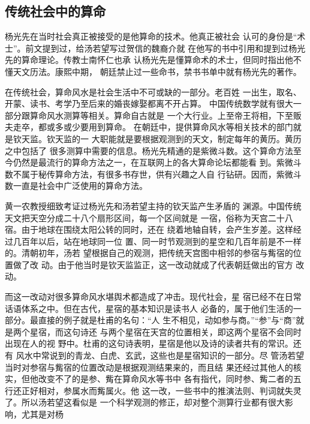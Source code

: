 \subsection{传统社会中的算命}
\par
杨光先在当时社会真正被接受的是他算命的技术。他真正被社会%
认可的身份是“术士”。前文提到过，给汤若望写过贺信的魏裔介就%
在他写的书中引用和提到过杨光先的算命理论。传教士南怀仁也承%
认杨光先是懂算命术的术士，但同时指出他不懂天文历法。康熙中期，%
朝廷禁止过一些命书，禁书书单中就有杨光先的著作。%
\par
在传统社会，算命风水是社会生活中不可或缺的一部分。老百姓%
一出生，取名、开蒙、读书、考学乃至后来的婚丧嫁娶都离不开占算。%
中国传统数学就有很大一部分跟算命风水测算等相关。算命自古就是%
一个大行业。上至帝王将相，下至贩夫走卒，都或多或少要用到算命。%
在朝廷中，提供算命风水等相关技术的部门就是钦天监。钦天监的一%
大职能就是要根据观测到的天文，制定每年的黄历。黄历之中包括了%
很多测算中需要的信息。杨光先精通的是紫微斗数。这个算命方法至%
今仍然是最流行的算命方法之一，在互联网上的各大算命论坛都能看%
到。紫微斗数不属于秘传算命方法，有很多书存世，供有兴趣之人自%
行钻研。因而，紫微斗数一直是社会中广泛使用的算命方法。%
\par
黄一农教授细致考证过杨光先和汤若望主持的钦天监产生矛盾的%
渊源。中国传统天文把天空分成二十八个扇形区间，每一个区间就是%
一宿，俗称为天宫二十八宿。由于地球在围绕太阳公转的同时，还在%
绕着地轴自转，会产生岁差。这样经过几百年以后，站在地球同一位%
置、同一时节观测到的星空和几百年前是不一样的。清朝初年，汤若%
望根据自己的观测，把传统天宫图中相邻的参宿与觜宿的位置做了改%
动。由于他当时是钦天监监正，这一改动就成了代表朝廷做出的官方%
改动。%
\par
而这一改动对很多算命风水堪舆术都造成了冲击。现代社会，星%
宿已经不在日常话语体系之中。但在古代，星宿的基本知识是读书人%
必备的，属于他们生活的一部分。最直接的例子就是杜甫的名句：“人%
生不相见，动如参与商。”“参”与“商”就是两个星宿，而这句诗还%
与两个星宿在天宫的位置相关，即这两个星宿不会同时出现在人的视%
野中。杜甫的这句诗表明，星宿是他以及诗的读者共有的常识。还有%
风水中常说到的青龙、白虎、玄武，这些也是星宿知识的一部分。尽%
管汤若望当时对参宿与觜宿的位置改动是根据观测结果来的，而且结%
果还经过其他人的核实，但他改变不了的是参、觜在算命风水等书中%
各有指代，同时参、觜二者的五行还正好相对，参属水而觜属火。他%
这一改，一些书中的推演法则、判词就失灵了。所以汤若望这看似是%
一个科学观测的修正，却对整个测算行业都有很大影响，尤其是对杨%
